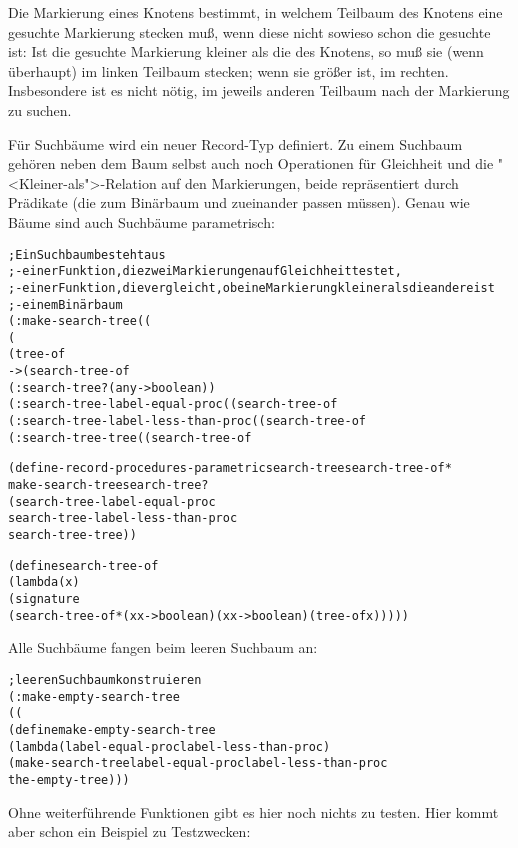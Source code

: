 Die Markierung eines Knotens bestimmt,
in welchem Teilbaum
des Knotens eine gesuchte Markierung stecken muß, wenn diese nicht sowieso schon die gesuchte ist: Ist die gesuchte
Markierung kleiner als die des Knotens, so muß sie (wenn überhaupt) im
linken Teilbaum stecken; wenn sie größer ist, im rechten.
Insbesondere ist es nicht nötig, im jeweils anderen Teilbaum nach der
Markierung zu suchen.

Für Suchbäume wird ein neuer Record-Typ
definiert. Zu einem Suchbaum
gehören neben dem Baum selbst auch noch Operationen für
Gleichheit und die "<Kleiner-als">-Relation auf den Markierungen, beide repräsentiert durch
Prädikate (die zum Binärbaum und zueinander passen müssen).  Genau wie
Bäume sind auch Suchbäume parametrisch:
%
\begin{alltt}
; Ein Suchbaum besteht aus
; - einer Funktion, die zwei Markierungen auf Gleichheit testet,
; - einer Funktion, die vergleicht, ob eine Markierung kleiner als die andere ist
; - einem Binärbaum
(: make-search-tree ((%a %a -> boolean) 
                     (%a %a -> boolean) 
                     (tree-of %a) 
                         -> (search-tree-of %a)))
(: search-tree? (any -> boolean))
(: search-tree-label-equal-proc ((search-tree-of %a) -> (%a %a -> boolean)))
(: search-tree-label-less-than-proc ((search-tree-of %a) -> (%a %a -> boolean)))
(: search-tree-tree ((search-tree-of %a) -> (tree-of %a)))

(define-record-procedures-parametric search-tree search-tree-of*
  make-search-tree search-tree?
  (search-tree-label-equal-proc
   search-tree-label-less-than-proc
   search-tree-tree))

(define search-tree-of
  (lambda (x)
    (signature
     (search-tree-of* (x x -> boolean) (x x -> boolean) (tree-of x)))))
\end{alltt}
%
Alle Suchbäume fangen
beim leeren Suchbaum an:
%
\begin{alltt}
; leeren Suchbaum konstruieren
(: make-empty-search-tree
   ((%a %a -> boolean) (%a %a -> boolean) -> (search-tree-of %a)))
(define make-empty-search-tree
  (lambda (label-equal-proc label-less-than-proc)
    (make-search-tree label-equal-proc label-less-than-proc
                      the-empty-tree)))
\end{alltt}
%
Ohne weiterführende Funktionen gibt es hier noch nichts zu testen. Hier kommt
aber schon ein Beispiel zu Testzwecken:

